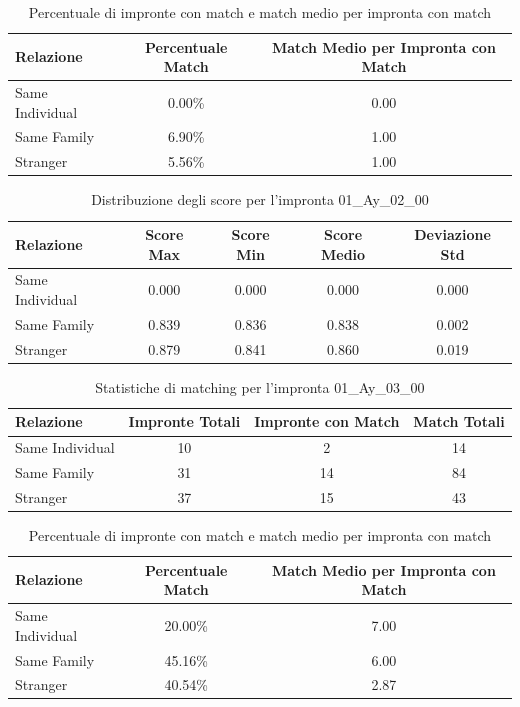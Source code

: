 \begin{table}[htbp]
\centering
\caption{Percentuale di impronte con match e match medio per impronta con match}
\label{tab:match_percentage_01_Ay_02_00}
\begin{tabular}{|l|c|c|}
\hline
\textbf{Relazione} & \textbf{Percentuale Match} & \textbf{Match Medio per Impronta con Match} \\
\hline
Same Individual & 0.00\% & 0.00 \\
\hline
Same Family & 6.90\% & 1.00 \\
\hline
Stranger & 5.56\% & 1.00 \\
\hline
\end{tabular}
\end{table}


\begin{table}[htbp]
\centering
\caption{Distribuzione degli score per l'impronta 01\_Ay\_02\_00}
\label{tab:scores_01_Ay_02_00}
\begin{tabular}{|l|c|c|c|c|}
\hline
\textbf{Relazione} & \textbf{Score Max} & \textbf{Score Min} & \textbf{Score Medio} & \textbf{Deviazione Std} \\
\hline
Same Individual & 0.000 & 0.000 & 0.000 & 0.000 \\
\hline
Same Family & 0.839 & 0.836 & 0.838 & 0.002 \\
\hline
Stranger & 0.879 & 0.841 & 0.860 & 0.019 \\
\hline
\end{tabular}
\end{table}


\begin{table}[htbp]
\centering
\caption{Statistiche di matching per l'impronta 01\_Ay\_03\_00}
\label{tab:results_01_Ay_03_00}
\begin{tabular}{|l|c|c|c|}
\hline
\textbf{Relazione} & \textbf{Impronte Totali} & \textbf{Impronte con Match} & \textbf{Match Totali} \\
\hline
Same Individual & 10 & 2 & 14 \\
\hline
Same Family & 31 & 14 & 84 \\
\hline
Stranger & 37 & 15 & 43 \\
\hline
\end{tabular}
\end{table}


\begin{table}[htbp]
\centering
\caption{Percentuale di impronte con match e match medio per impronta con match}
\label{tab:match_percentage_01_Ay_03_00}
\begin{tabular}{|l|c|c|}
\hline
\textbf{Relazione} & \textbf{Percentuale Match} & \textbf{Match Medio per Impronta con Match} \\
\hline
Same Individual & 20.00\% & 7.00 \\
\hline
Same Family & 45.16\% & 6.00 \\
\hline
Stranger & 40.54\% & 2.87 \\
\hline
\end{tabular}
\end{table}


